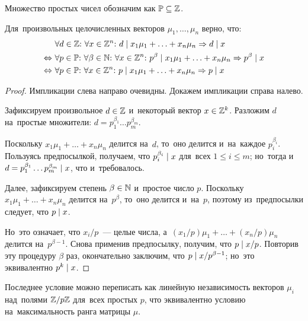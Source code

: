 \documentclass{article}
\begin{document}
Множество простых чисел обозначим как $\mathbb{P} \subseteq \mathbb{Z}$.

\begin{lemma*}
    Для~произвольных целочисленных векторов $\mu_1, \ldots, \mu_n$ верно, что:
    \begin{align*}
                         & \forall d \in \mathbb{Z}{:}\ \forall x \in \mathbb{Z}^n{:}\ d \mid x_1 \mu_1 + \ldots + x_n \mu_n \Rightarrow d \mid x \\
        \Leftrightarrow\ & \forall p \in \mathbb{P}{:}\ \forall \beta \in \mathbb{N}{:}\ \forall x \in \mathbb{Z}^n{:}\ p^\beta \mid x_1 \mu_1 + \ldots + x_n \mu_n \Rightarrow p^\beta \mid x \\
        \Leftrightarrow\ & \forall p \in \mathbb{P}{:}\ \forall x \in \mathbb{Z}^n{:}\ p \mid x_1 \mu_1 + \ldots + x_n \mu_n \Rightarrow p \mid x
    \end{align*}
\end{lemma*}

\begin{proof}
    Импликации слева направо очевидны. Докажем импликации справа налево.

    Зафиксируем произвольное $d \in \mathbb{Z}$ и~некоторый вектор $x \in \mathbb{Z}^k$.
    Разложим $d$ на~простые множители: $d = p_1^{\beta_1} \ldots p_m^{\beta_m}$.

    Поскольку $x_1 \mu_1 + \ldots + x_n \mu_n$ делится на~$d$, то~оно делится и~на~каждое $p_i^{\beta_i}$.
    Пользуясь предпосылкой, получаем, что $p_i^{\beta_i} \mid x$ для~всех $1 \leq i \leq m$;
    но~тогда и~$d = p_1^{\beta_1} \ldots p_m^{\beta_m} \mid x$, что и~требовалось.

    Далее, зафиксируем степень $\beta \in \mathbb{N}$ и~простое число $p$.
    Поскольку $x_1 \mu_1 + \ldots + x_n \mu_n$ делится на~$p^\beta$,
    то~оно делится и~на~$p$, поэтому из~предпосылки следует, что $p \mid x$.

    Но~это означает, что $x_i / p$~— целые числа, а~$(x_1 / p) \mu_1 + \ldots + (x_n / p) \mu_n$ делится на~$p^{\beta - 1}$.
    Снова применив предпосылку, получим, что $p \mid x / p$.
    Повторив эту процедуру $\beta$ раз, окончательно заключим, что $p \mid x / p^{\beta - 1}$;
    но~это эквивалентно $p^k \mid x$.
\end{proof}

Последнее условие можно переписать как линейную независимость векторов $\mu_i$ над~полями $\mathbb{Z} / p\mathbb{Z}$ для~всех простых $p$,
что эквивалентно условию на~максимальность ранга матрицы $\mu$.
\end{document}

